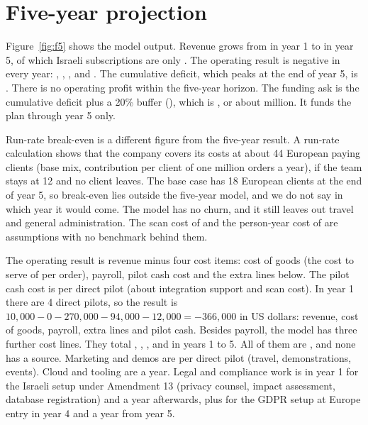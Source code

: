 \section{Five-year projection}\label{sec:projection}
Figure~\ref{fig:f5} shows the model output. Revenue grows from  in year 1 to  in year 5, of which Israeli subscriptions are only . The operating result is negative in every year: , , ,  and . The cumulative deficit, which peaks at the end of year 5, is . There is no operating profit within the five-year horizon. The funding ask is the cumulative deficit plus a 20\% buffer (), which is , or about  million. It funds the plan through year 5 only.

Run-rate break-even is a different figure from the five-year result. A run-rate calculation shows that the company covers its costs at about 44 European paying clients (base mix,  contribution per client of one million orders a year), if the team stays at 12 and no client leaves. The base case has 18 European clients at the end of year 5, so break-even lies outside the five-year model, and we do not say in which year it would come. The model has no churn, and it still leaves out travel and general administration. The scan cost of  and the person-year cost of  are assumptions with no benchmark behind them.

The operating result is revenue minus four cost items: cost of goods (the cost to serve of  per order), payroll, pilot cash cost and the extra lines below. The pilot cash cost is  per direct pilot (about  integration support and  scan cost). In year 1 there are 4 direct pilots, so the result is $10{,}000 - 0 - 270{,}000 - 94{,}000 - 12{,}000 = -366{,}000$ in US dollars: revenue, cost of goods, payroll, extra lines and pilot cash. Besides payroll, the model has three further cost lines. They total , , ,  and  in years 1 to 5. All of them are , and none has a source. Marketing and demos are  per direct pilot (travel, demonstrations, events). Cloud and tooling are  a year. Legal and compliance work is  in year 1 for the Israeli setup under Amendment 13 (privacy counsel, impact assessment, database registration) and  a year afterwards, plus  for the GDPR setup at Europe entry in year 4 and  a year from year 5.

